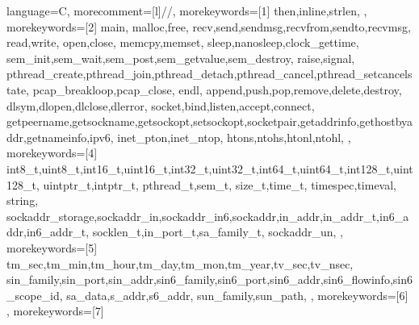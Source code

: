\def\lstCFontPredefLibAlike{\color{lstCol_C_violet}}%
\def\lstCFontFuncCall{\color{lstCol_C_func}}%
\def\lstCFontVar{\color{lstCol_C_var}}%
\def\lstCFontType{\color{lstCol_C_green}}%
\def\lstCFontCollection{\color{lstCol_C_collection}}%
\def\lstCFontSpecialBasic{\color{lstCol_C_purple}}%
\def\lstCFontSpecialLib{\color{lstCol_C_violet}}%
\def\lstCFontForeignA{\color{lstCol_C_foreign1}\bfseries}%
\def\lstCFontForeignB{\color{lstCol_C_foreign2}\bfseries}%
\def\lstCFontObject{\color{lstCol_C_object}}%
\def\lstCFontMoreKey{\color{lstCol_C_moreKey}}%
\def\lstCFontHighRed{\color{red}\bfseries}%
\def\lstCFontFuncDeclPlain{\bfseries}%
\def\lstCFontFuncDecl{\color{lstCol_C_func}\bfseries}%
%
%
{%
	language=C,%
	morecomment=[l]{//},%
	morekeywords=[1]{%
		then,inline,strlen,%
	},%
	morekeywords=[2]{%
		main,
		malloc,free,%
		recv,send,sendmsg,recvfrom,sendto,recvmsg,
		read,write,
		open,close,
		memcpy,memset,
		sleep,nanosleep,clock_gettime,
		sem_init,sem_wait,sem_post,sem_getvalue,sem_destroy,
		raise,signal,
		pthread_create,pthread_join,pthread_detach,pthread_cancel,pthread_setcancelstate,
		pcap_breakloop,pcap_close,
		endl,
		append,push,pop,remove,delete,destroy,
		dlsym,dlopen,dlclose,dlerror,
		socket,bind,listen,accept,connect,
		getpeername,getsockname,getsockopt,setsockopt,socketpair,getaddrinfo,gethostbyaddr,getnameinfo,ipv6,
		inet_pton,inet_ntop,
		htons,ntohs,htonl,ntohl,
	},%
	morekeywords=[4]{%
		int8_t,uint8_t,int16_t,uint16_t,int32_t,uint32_t,int64_t,uint64_t,int128_t,uint128_t,
		uintptr_t,intptr_t,
		pthread_t,sem_t,
		size_t,time_t,
		timespec,timeval,
		string,
		sockaddr_storage,sockaddr_in,sockaddr_in6,sockaddr,in_addr,in_addr_t,in6_addr,in6_addr_t,
		socklen_t,in_port_t,sa_family_t,
		sockaddr_un,
	},%
	morekeywords=[5]{%
		tm_sec,tm_min,tm_hour,tm_day,tm_mon,tm_year,tv_sec,tv_nsec,
		sin_family,sin_port,sin_addr,sin6_family,sin6_port,sin6_addr,sin6_flowinfo,sin6_scope_id,
		sa_data,s_addr,s6_addr,
		sun_family,sun_path,
	},%
	morekeywords=[6]{%
	},%
	morekeywords=[7]{%
}}
